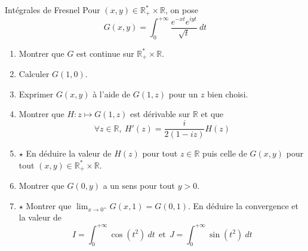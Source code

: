 \documentclass[french,a4paper]{article}
\newcommand{\R}{\mathbb{R}}
\newcommand{\st}{^*}
\theoremstyle{plain}
\theoremstyle{definition}
\theoremstyle{remark}
\begin{document}
\begin{ex}[Moulin.IP.27]{Intégrales de Fresnel}
	Pour $(x,y)\in\R_+\st\times\R$, on pose $$G(x,y)=\int_{0}^{+\infty}\frac{e^{-xt}e^{iyt}}{\sqrt{t}}\ dt$$
	\begin{enumerate}
		\item Montrer que $G$ est continue sur $\R_+\st\times\R$.
		\item Calculer $G(1,0)$.
		\item Exprimer $G(x,y)$ à l'aide de $G(1,z)$ pour un $z$ bien choisi.
		\item Montrer que $H:z\mapsto G(1,z)$ est dérivable sur $\R$ et que $$\forall z\in\R,\ H'(z)=\frac{i}{2(1-iz)}H(z)$$
		\item $\star$ En déduire la valeur de $H(z)$ pour tout $z\in\R$ puis celle de $G(x,y)$ pour tout $(x,y)\in\R_+\st\times\R$.
		\item Montrer que $G(0,y)$ a un sens pour tout $y>0$.
		\item $\star$ Montrer que $\displaystyle\lim_{x\to 0^+}G(x,1)=G(0,1)$. En déduire la convergence et la valeur de $$I=\int_{0}^{+\infty}\cos(t^2)\ dt \ \ \text{et} \ \ J=\int_{0}^{+\infty}\sin(t^2)\ dt$$
	\end{enumerate}
\end{ex}
\end{document}
